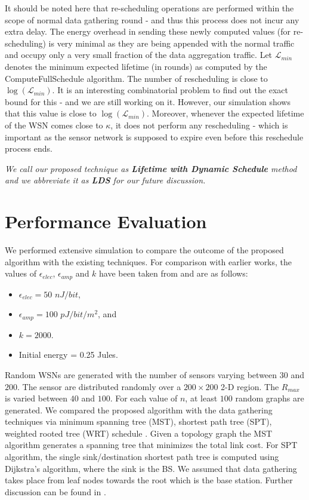 \documentclass[10pt]{llncs}
\begin{document}
It should be noted here that re-scheduling operations are performed within the scope of normal data gathering round - and thus this process does not incur any extra delay. The energy overhead in sending these newly computed values (for re-scheduling) is very minimal as they are being appended with the normal traffic and occupy only a very small fraction of the data aggregation traffic. Let $\mathcal{L}_{min}$ denotes the minimum expected lifetime (in rounds) as computed by the ComputeFullSchedule algorithm. The number of rescheduling is close to $\log(\mathcal{L}_{min})$. It is an interesting combinatorial problem to find out the exact bound for this - and we are still working on it. However, our simulation shows that this value is close to $\log(\mathcal{L}_{min})$. Moreover, whenever the expected lifetime of the WSN comes close to $\kappa$, it does not perform any rescheduling - which is important as the sensor network is supposed to expire even before this reschedule process ends.

{\it We call our proposed technique as {\bf Lifetime with Dynamic Schedule} method and we abbreviate it as {\bf LDS} for our future discussion.}



\section{Performance Evaluation}

We performed extensive simulation to compare the outcome of the proposed algorithm with the existing techniques. For comparison with earlier works, the values of $\epsilon_{elec}$, $\epsilon_{amp}$ and $k$ have been taken from \cite{Lindsey01} and are as follows:
\begin{itemize}
\item[] $\epsilon_{elec} = 50$ $nJ/bit$,
\item[] $\epsilon_{amp} = 100$ $pJ/bit/m^2$, and
\item[] $k = 2000$.
\item[] Initial energy = 0.25 Jules.
\end{itemize}

Random WSNs are generated with the number of sensors varying between $30$ and $200$. The sensor are distributed randomly over a $200 \times 200$ 2-D region. The $R_{max}$ is varied between $40$ and $100$. For each value of $n$, at least $100$ random graphs are generated. We compared the proposed algorithm with the data gathering techniques via minimum spanning tree (MST), shortest path tree (SPT), weighted rooted tree (WRT) schedule \cite{Bhattacharjee07}. Given a topology graph the MST algorithm generates a spanning tree that minimizes the total link cost. For SPT algorithm, the single sink/destination shortest path tree is computed using Dijkstra's algorithm, where the sink is the BS. We assumed that data gathering takes place from leaf nodes towards the root which is the base station. Further discussion can be found in \cite{Bhattacharjee07}.
\end{document}
